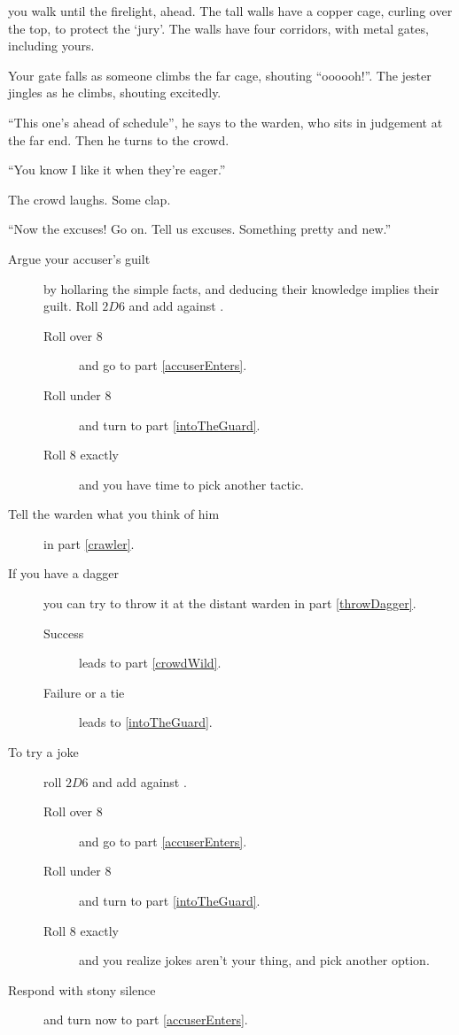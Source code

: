 you walk until the firelight, ahead.
The tall walls have a copper cage, curling over the top, to protect the `jury'.
The walls have four corridors, with metal gates, including yours.

Your gate falls as someone climbs the far cage, shouting ``oooooh!''.
The jester jingles as he climbs, shouting excitedly.

``This one's ahead of schedule'', he says to the \gls{warden}, who sits in judgement at the far end.
Then he turns to the crowd.

``You know I like it when they're eager.''

The crowd laughs.
Some clap.

``Now the excuses!
Go on.
Tell us excuses.
Something pretty and new.''

\begin{description}
  \item[Argue your accuser's guilt]
  by hollaring the simple facts, and deducing their knowledge implies their guilt.
  Roll $2D6$ and add  against \tn[8].
  \begin{description}
    \item[Roll over 8]
    and go to part \vref{accuserEnters}.
    \item[Roll under 8]
    and turn to part \vref{intoTheGuard}.
    \item[Roll 8 exactly]
    and you have time to pick another tactic.
  \end{description}
  \item[Tell the \gls{warden} what you think of him]
  in part \vref{crawler}.
  \item[If you have a dagger]
  you can try to throw it at the distant \gls{warden} in part \vref{throwDagger}.
  \begin{description}
    \item[Success]
    leads to part \vref{crowdWild}.
    \item[Failure or a tie]
    leads to \vref{intoTheGuard}.
  \end{description}
  \item[To try a joke]
  roll $2D6$ and add  against \tn[8].
  \begin{description}
    \item[Roll over 8]
    and go to part \vref{accuserEnters}.
    \item[Roll under 8]
    and turn to part \vref{intoTheGuard}.
    \item[Roll 8 exactly]
    and you realize jokes aren't your thing, and pick another option.
  \end{description}
  \item[Respond with stony silence]
  and turn now to part \vref{accuserEnters}.
\end{description}


